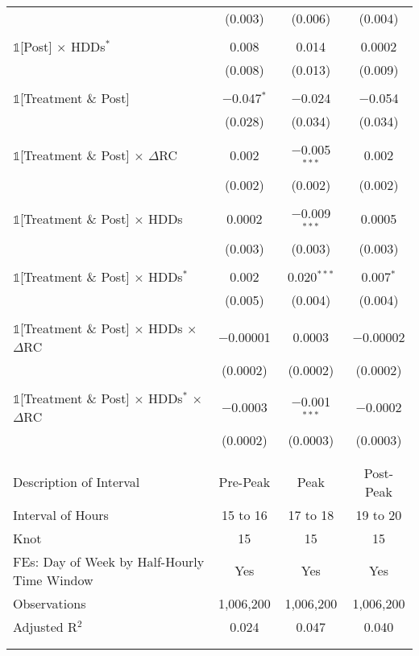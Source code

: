 {\begin{table}[t!]
\begin{ThreePartTable}
\begin{longtable}{@{\extracolsep{40pt}}lccc}
                & (0.003) & (0.006) & (0.004) \\
                & & & \\
                $\mathbb{1}$[Post] $\times$ HDDs$^{*}$ & 0.008 & 0.014 & 0.0002 \\
                & (0.008) & (0.013) & (0.009) \\
                & & & \\
                $\mathbb{1}$[Treatment \& Post] & $-$0.047$^{*}$ & $-$0.024 & $-$0.054 \\
                & (0.028) & (0.034) & (0.034) \\
                & & & \\
                $\mathbb{1}$[Treatment \& Post] $\times$ $\Delta$RC & 0.002 & $-$0.005$^{***}$ & 0.002 \\
                & (0.002) & (0.002) & (0.002) \\
                & & & \\
                $\mathbb{1}$[Treatment \& Post] $\times$ HDDs & 0.0002 & $-$0.009$^{***}$ & 0.0005 \\
                & (0.003) & (0.003) & (0.003) \\
                & & & \\
                $\mathbb{1}$[Treatment \& Post] $\times$ HDDs$^{*}$ & 0.002 & 0.020$^{***}$ & 0.007$^{*}$ \\
                & (0.005) & (0.004) & (0.004) \\
                & & & \\
                $\mathbb{1}$[Treatment \& Post] $\times$ HDDs $\times$ $\Delta$RC & $-$0.00001 & 0.0003 & $-$0.00002 \\
                & (0.0002) & (0.0002) & (0.0002) \\
                & & & \\
                $\mathbb{1}$[Treatment \& Post] $\times$ HDDs$^{*}$ $\times$ $\Delta$RC & $-$0.0003 & $-$0.001$^{***}$ & $-$0.0002 \\
                & (0.0002) & (0.0003) & (0.0003) \\
                & & & \\
                \hline
                \\[-2.0ex]
                Description of Interval & Pre-Peak & Peak & Post-Peak \\
                Interval of Hours & 15 to 16 & 17 to 18 & 19 to 20 \\
                Knot & 15 & 15 & 15 \\
                FEs: Day of Week by Half-Hourly Time Window & Yes & Yes & Yes \\
                Observations & 1,006,200 & 1,006,200 & 1,006,200 \\
                Adjusted R$^{2}$ & 0.024 & 0.047 & 0.040 \\
                \\[-2.0ex]
                \hline \hline
                \\[-4.5ex]
                

\end{longtable}
\end{ThreePartTable}
\end{table}}
